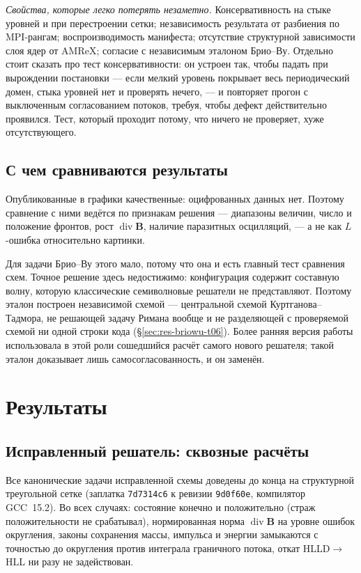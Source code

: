 \documentclass[12pt,a4paper]{article}
\newcommand{\divg}{\operatorname{div}}
\newcommand{\B}{\mathbf{B}}
\newcommand{\code}[1]{\texttt{#1}}
\begin{document}
\emph{Свойства, которые легко потерять незаметно.} Консервативность на стыке
уровней и при перестроении сетки; независимость результата от разбиения по
MPI-рангам; воспроизводимость манифеста; отсутствие структурной зависимости
слоя ядер от AMReX; согласие с независимым эталоном Брио--Ву. Отдельно стоит
сказать про тест консервативности: он устроен так, чтобы падать при вырождении
постановки — если мелкий уровень покрывает весь периодический домен, стыка
уровней нет и проверять нечего, — и повторяет прогон с выключенным согласованием
потоков, требуя, чтобы дефект действительно проявился. Тест, который проходит
потому, что ничего не проверяет, хуже отсутствующего.

\subsection{С чем сравниваются результаты}

Опубликованные в \cite{shamanov2025,avdeeva2019} графики качественные:
оцифрованных данных нет. Поэтому сравнение с ними ведётся по признакам решения —
диапазоны величин, число и положение фронтов, рост $\divg\B$, наличие паразитных
осцилляций, — а не как $L$-ошибка относительно картинки.

Для задачи Брио--Ву этого мало, потому что она и есть главный тест сравнения
схем. Точное решение здесь недостижимо: конфигурация содержит составную волну,
которую классические семиволновые решатели не представляют. Поэтому эталон
построен независимой схемой — центральной схемой Куртганова--Тадмора, не
решающей задачу Римана вообще и не разделяющей с проверяемой схемой ни одной
строки кода (\S\ref{sec:res-briowu-t06}). Более ранняя версия работы
использовала в этой роли сошедшийся расчёт самого нового решателя; такой эталон
доказывает лишь самосогласованность, и он заменён.

\section{Результаты}
\label{sec:res}

\subsection{Исправленный решатель: сквозные расчёты}
\label{sec:res-legacy}

Все канонические задачи исправленной схемы доведены до конца на
структурной треугольной сетке (заплатка \code{7d7314c6} к ревизии
\code{9d0f60e}, компилятор GCC~15.2). Во всех случаях: состояние конечно и
положительно (страж положительности не срабатывал), нормированная норма
$\divg\B$ на уровне ошибок округления, законы сохранения массы, импульса и
энергии замыкаются с точностью до округления против интеграла граничного
потока, откат HLLD$\to$HLL ни разу не задействован.
\end{document}
